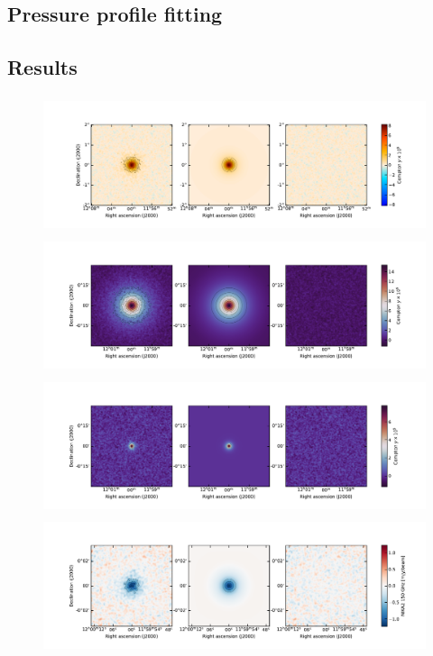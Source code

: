 \subsection{Pressure profile fitting}

\subsection{Results} \label{sec:simu:results}

\begin{figure}[t]
    \centering
    \includegraphics[height=4cm, trim={2cm 0.7cm 1.5cm 1.5cm}, clip]{../validation/results/C1/Planck/data_model_residuals_maps.pdf}
    \includegraphics[height=4cm, trim={2cm 0.7cm 1.5cm 1.5cm}, clip]{../validation/results/C1/SPT/data_model_residuals_maps.pdf}
    \includegraphics[height=4cm, trim={2cm 0.7cm 1.5cm 1.5cm}, clip]{../validation/results/C2/SPT/data_model_residuals_maps.pdf}
    \includegraphics[height=4cm, trim={2cm 0.7cm 1.5cm 1.5cm}, clip]{../validation/results/C2/NIKA2/data_model_residuals_maps.pdf}

\end{figure}
